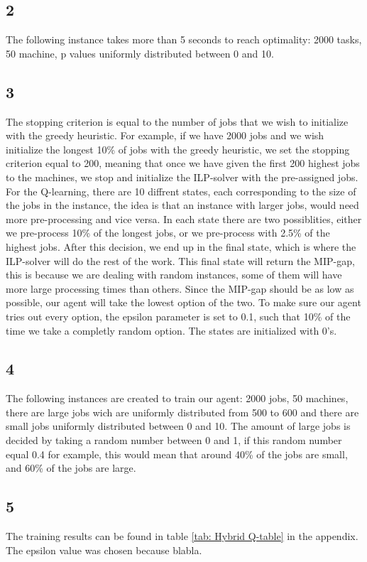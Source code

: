 \documentclass{article}
\begin{document}
\subsection*{2}
The following instance takes more than 5 seconds to reach optimality: 2000 tasks, 50 machine, p values uniformly distributed between 0 and 10. 
\subsection*{3}
The stopping criterion is equal to the number of jobs that we wish to initialize with the greedy heuristic. For example, if we have 2000 jobs and we wish initialize the longest 10\% of jobs with the greedy heuristic, we set the stopping criterion equal to 200, meaning that once we have given the first 200 highest jobs to the machines, we stop and initialize the ILP-solver with the pre-assigned jobs. For the Q-learning, there are 10 diffrent states, each corresponding to the size of the jobs in the instance, the idea is that an instance with larger jobs, would need more pre-processing and vice versa. In each state there are two possiblities, either we pre-process 10\% of the longest jobs, or we pre-process with 2.5\% of the highest jobs. After this decision, we end up in the final state, which is where the ILP-solver will do the rest of the work. This final state will return the MIP-gap, this is because we are dealing with random instances, some of them will have more large processing times than others. Since the MIP-gap should be as low as possible, our agent will take the lowest option of the two. To make sure our agent tries out every option, the epsilon parameter is set to 0.1, such that 10\% of the time we take a completly random option. The states are initialized with 0's.  
\subsection*{4}
The following instances are created to train our agent: 2000 jobs, 50 machines, there are large jobs wich are uniformly distributed from 500 to 600 and there are small jobs uniformly distributed between 0 and 10. The amount of large jobs is decided by taking a random number between 0 and 1, if this random number equal 0.4 for example, this would mean that around 40\% of the jobs are small, and 60\% of the jobs are large.  
\subsection*{5}
The training results can be found in table \ref{tab: Hybrid Q-table} in the appendix. The epsilon value was chosen because blabla.
\end{document}
